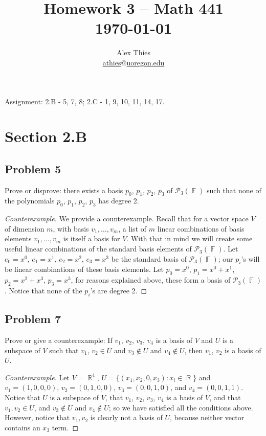 \documentclass[letterpaper, 12pt]{amsart}
\DeclareMathOperator{\R}{\mathbb{R}}
\DeclareMathOperator{\F}{\mathbb{F}}
\theoremstyle{definition}  %
\begin{document}
	\title{Homework 3  -- Math 441 \\ \today}
	\author{Alex Thies \\ \href{mailto:athies@uoregon.edu}{\lowercase{athies$@$uoregon.edu}}}

	\maketitle

	Assignment: 2.B - 5, 7, 8; 2.C - 1, 9, 10, 11, 14, 17.

	\section*{Section 2.B}
		\subsection*{Problem 5}
		Prove or disprove: there exists a basis $p_{0}$, $p_{1}$, $p_{2}$, $p_{3}$ of $\mathcal{P}_{3}(\F)$ such that none of the polynomials $p_{0}$, $p_{1}$, $p_{2}$, $p_{3}$ has degree 2.

		\begin{proof}[Counterexample]
		We provide a counterexample.
		Recall that for a vector space $V$ of dimension $m$, with basis $v_{1}, \dots, v_{m}$, a list of $m$ linear combinations of basis elements $v_{1}, \dots, v_{m}$ is itself a basis for $V$.
		With that in mind we will create some useful linear combinations of the standard basis elements of $\mathcal{P}_{3}(\F)$.
		Let $e_{0} = x^{0}$, $e_{1} = x^{1}$, $e_{2} = x^{2}$, $e_{3} = x^{3}$ be the standard basis of $\mathcal{P}_{3}(\F)$; our $p_{i}$'s will be linear combinations of these basis elements.
		Let $p_{0} = x^{0}$, $p_{1} = x^{0} + x^{1}$, $p_{2} = x^{2} + x^{3}$, $p_{3} = x^{3}$, for reasons explained above, these form a basis of $\mathcal{P}_{3}(\F)$.
		Notice that none of the $p_{i}$'s are degree 2.
		\end{proof}

		\subsection*{Problem 7}
		Prove or give a counterexample: If $v_{1}$, $v_{2}$, $v_{3}$, $v_{4}$ is a basis of $V$ and $U$ is a subspace of $V$ such that $v_{1}$, $v_{2} \in U$ and $v_{3} \notin U$ and $v_{4} \notin U$, then $v_{1}$, $v_{2}$ is a basis of $U$.

		\begin{proof}[Counterexample]
		Let $V = \R^{4}$, $U = \{ (x_{1}, x_{2}, 0, x_{3}) : x_{i} \in \R \}$ and $v_{1} = (1,0,0,0)$, $v_{2} = (0,1,0,0)$, $v_{3} = (0,0,1,0)$, and $v_{4} = (0,0,1,1)$.
		Notice that $U$ is a subspace of $V$, that $v_{1}$, $v_{2}$, $v_{3}$, $v_{4}$ is a basis of $V$, and that $v_{1}, v_{2} \in U$, and $v_{3} \notin U$ and $v_{4} \notin U$; so we have satisfied all the conditions above.
		However, notice that $v_{1}, v_{2}$ is clearly not a basis of $U$, because neither vector contains an $x_{3}$ term.
		\end{proof}
\end{document}
